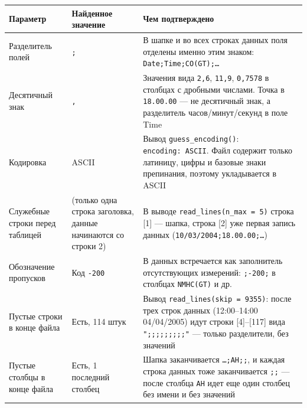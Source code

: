 \documentclass[
]{article}
\newcounter{none} %
\begin{document}
{\def\LTcaptype{none} %
\begin{longtable}[]{@{}
  >{\raggedright\arraybackslash}p{}
  >{\raggedright\arraybackslash}p{}
  >{\raggedright\arraybackslash}p{}@{}}
\toprule\noalign{}
\begin{minipage}[b]{\linewidth}\raggedright
Параметр
\end{minipage} & \begin{minipage}[b]{\linewidth}\raggedright
Найденное значение
\end{minipage} & \begin{minipage}[b]{\linewidth}\raggedright
Чем подтверждено
\end{minipage} \\
\midrule\noalign{}
\endhead
\bottomrule\noalign{}
\endlastfoot
Разделитель полей & \texttt{;} & В шапке и во всех строках данных поля
отделены именно этим знаком: \texttt{Date;Time;CO(GT);…} \\
Десятичный знак & \texttt{,} & Значения вида \texttt{2,6},
\texttt{11,9}, \texttt{0,7578} в столбцах с дробными числами. Точка в
\texttt{18.00.00} --- не десятичный знак, а разделитель
часов/минут/секунд в поле Time \\
Кодировка & ASCII & Вывод \texttt{guess\_encoding()}:
\texttt{encoding:\ ASCII}. Файл содержит только латиницу, цифры и
базовые знаки препинания, поэтому укладывается в ASCII \\
Служебные строки перед таблицей & 1 (только одна строка заголовка,
данные начинаются со строки 2) & В выводе
\texttt{read\_lines(n\_max\ =\ 5)} строка {[}1{]} --- шапка, строка
{[}2{]} уже первая запись данных (\texttt{10/03/2004;18.00.00;…}) \\
Обозначение пропусков & Код \texttt{-200} & В данных встречается как
заполнитель отсутствующих измерений: \texttt{;-200;} в столбцах
\texttt{NMHC(GT)} и др. \\
Пустые строки в конце файла & Есть, 114 штук & Вывод
\texttt{read\_lines(skip\ =\ 9355)}: после трех строк данных
(12:00--14:00 04/04/2005) идут строки {[}4{]}--{[}117{]} вида
\texttt{";;;;;;;;;"} --- только разделители, без значений \\
Пустые столбцы в конце файла & Есть, 1 последний столбец & Шапка
заканчивается \texttt{…;AH;;}, и каждая строка данных тоже заканчивается
\texttt{;;} --- после столбца \texttt{AH} идет еще один столбец без
имени и без значений \\
\end{longtable}
}
\end{document}

